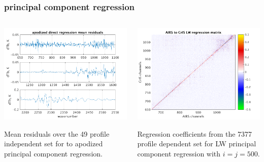 \documentclass[10pt]{beamer}
\begin{document}
\begin{frame}
\frametitle{principal component regression}
\begin{columns}[t]
\begin{column}{0.5\textwidth}
  \begin{centering}
  \includegraphics[width=\textwidth]{slackfigs/ap_pc_direct_regr.png}
  \end{centering}\vspace{3mm}
  Mean residuals over the 49 profile independent set for {\airs} to
  apodized {\cris} principal component regression.

\end{column}
\begin{column}{0.5\textwidth}  
  \begin{centering}
  \includegraphics[width=\textwidth]{slackfigs/LW_pc_regr_mat.png}
  \end{centering}\vspace{3mm}
  Regression coefficients from the 7377 profile dependent set for
  LW principal component regression with $i = j = 500$.
 
\end{column}
\end{columns}
\end{frame}
\end{document}
